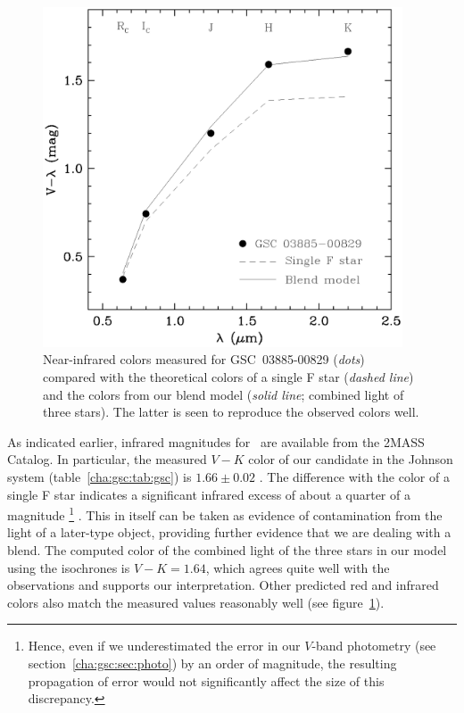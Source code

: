\begin{figure}
\begin{center}
\includegraphics[width=0.95\textwidth]{3_f7}
\caption[Near-infrared colors for \mbox{GSC 03885-00829} and an F star]{Near-infrared colors measured for \mbox{GSC 03885-00829}
  ({\it dots}) compared with the theoretical colors of a single F star
  ({\it dashed line}) and the colors from our blend model ({\it solid line};
  combined light of three stars). The latter is seen to reproduce the
  observed colors well.}
\label{cha:gsc:fig:colors}
\end{center}
\end{figure}

As indicated earlier, infrared magnitudes for \gscOTE\ are
available from the 2MASS Catalog.  In particular, the measured $V-K$
color of our candidate in the Johnson system (table~\ref{cha:gsc:tab:gsc}) is
$1.66 \pm 0.02$
\citep[using transformations from the 2MASS system
by][]{Carpenter:aj:2001a}. The difference with the color of a single F star
indicates a significant infrared excess of about a quarter of a
magnitude%
\footnote{Hence, even if we underestimated the error in our $V$-band
  photometry (see section~\ref{cha:gsc:sec:photo}) by an order of magnitude, the
  resulting propagation of error would not significantly affect the
  size of this discrepancy.}%
. This in itself can be taken as evidence of contamination
from the light of a later-type object, providing further evidence that
we are dealing with a blend. The computed color of the combined light
of the three stars in our model using the
 \citet{Baraffe_Chabrier_Allard:aa:1998a} isochrones
is $V-K = 1.64$, which agrees quite well with the observations and
supports our interpretation. Other predicted red and infrared colors
also match the measured values reasonably well (see figure~\ref{cha:gsc:fig:colors}).

